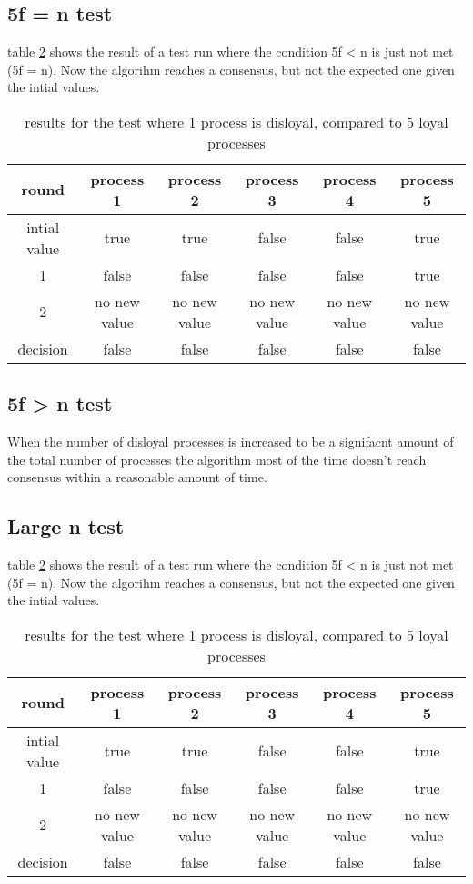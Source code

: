 \subsection{5f = n test}
table \ref{table:resultsBoundaryDisloyal} shows the result of a test run where the condition 5f < n is just not met (5f = n). 
Now the algorihm reaches a consensus, but not the expected one given the intial values.


\begin{table}[h]
	\begin{tabular}{ | c | c  | c  | c| c | c |}
		\hline
  		round & process 1 & process 2 & process 3 & process 4 & process 5  \\
		\hline
 		intial value &  true & true & false  & false & true\\
		\hline
		1  &  false & false & false  & false & true  \\
		\hline
		2  &  no new value & no new value & no new value  & no new value & no new value \\
		\hline
  		decision  &  false & false & false  & false & false \\
		\hline
	\end{tabular}
	\caption{results for the test where 1 process is disloyal, compared to 5 loyal processes}	
	\label{table:resultsBoundaryDisloyal}
\end{table}

\subsection{5f > n test}
 
When the number of disloyal processes is  increased to be a signifacnt amount of the total number of processes the algorithm most of the time doesn't reach consensus within a reasonable amount of time.

\subsection{Large n test}
table \ref{table:resultsBoundaryDisloyal} shows the result of a test run where the condition 5f < n is just not met (5f = n). 
Now the algorihm reaches a consensus, but not the expected one given the intial values.


\begin{table}[h]
	\begin{tabular}{ | c | c  | c  | c| c | c |}
		\hline
  		round & process 1 & process 2 & process 3 & process 4 & process 5  \\
		\hline
 		intial value &  true & true & false  & false & true\\
		\hline
		1  &  false & false & false  & false & true  \\
		\hline
		2  &  no new value & no new value & no new value  & no new value & no new value \\
		\hline
  		decision  &  false & false & false  & false & false \\
		\hline
	\end{tabular}
	\caption{results for the test where 1 process is disloyal, compared to 5 loyal processes}	
	\label{table:resultsBoundaryDisloyal}
\end{table}